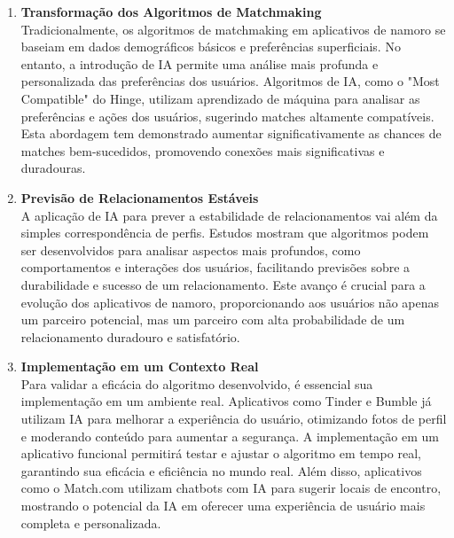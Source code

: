 \begin{enumerate}
    \item \textbf{Transformação dos Algoritmos de Matchmaking}\\
    Tradicionalmente, os algoritmos de matchmaking em aplicativos de namoro se baseiam em dados demográficos básicos e preferências superficiais. No entanto, a introdução de IA permite uma análise mais profunda e personalizada das preferências dos usuários. Algoritmos de IA, como o "Most Compatible" do Hinge, utilizam aprendizado de máquina para analisar as preferências e ações dos usuários, sugerindo matches altamente compatíveis. Esta abordagem tem demonstrado aumentar significativamente as chances de matches bem-sucedidos, promovendo conexões mais significativas e duradouras.

    \item \textbf{Previsão de Relacionamentos Estáveis}\\
    A aplicação de IA para prever a estabilidade de relacionamentos vai além da simples correspondência de perfis. Estudos mostram que algoritmos podem ser desenvolvidos para analisar aspectos mais profundos, como comportamentos e interações dos usuários, facilitando previsões sobre a durabilidade e sucesso de um relacionamento. Este avanço é crucial para a evolução dos aplicativos de namoro, proporcionando aos usuários não apenas um parceiro potencial, mas um parceiro com alta probabilidade de um relacionamento duradouro e satisfatório.

    \item \textbf{Implementação em um Contexto Real}\\
    Para validar a eficácia do algoritmo desenvolvido, é essencial sua implementação em um ambiente real. Aplicativos como Tinder e Bumble já utilizam IA para melhorar a experiência do usuário, otimizando fotos de perfil e moderando conteúdo para aumentar a segurança. A implementação em um aplicativo funcional permitirá testar e ajustar o algoritmo em tempo real, garantindo sua eficácia e eficiência no mundo real. Além disso, aplicativos como o Match.com utilizam chatbots com IA para sugerir locais de encontro, mostrando o potencial da IA em oferecer uma experiência de usuário mais completa e personalizada.
\end{enumerate}
